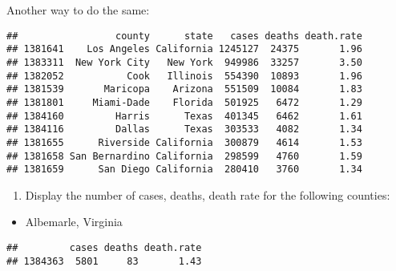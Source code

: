 \documentclass[
]{article}
\newenvironment{Shaded}{\begin{snugshade}}{\end{snugshade}}
\newcommand{\DecValTok}[1]{\textcolor[rgb]{0.00,0.00,0.81}{#1}}
\newcommand{\FunctionTok}[1]{\textcolor[rgb]{0.00,0.00,0.00}{#1}}
\newcommand{\NormalTok}[1]{#1}
\newcommand{\SpecialCharTok}[1]{\textcolor[rgb]{0.00,0.00,0.00}{#1}}
\newcommand{\StringTok}[1]{\textcolor[rgb]{0.31,0.60,0.02}{#1}}
\providecommand{\tightlist}{%
  \setlength{\itemsep}{0pt}\setlength{\parskip}{0pt}}
\begin{document}
Another way to do the same:

\begin{Shaded}
\end{Shaded}

\begin{verbatim}
##                 county      state   cases deaths death.rate
## 1381641    Los Angeles California 1245127  24375       1.96
## 1383311  New York City   New York  949986  33257       3.50
## 1382052           Cook   Illinois  554390  10893       1.96
## 1381539       Maricopa    Arizona  551509  10084       1.83
## 1381801     Miami-Dade    Florida  501925   6472       1.29
## 1384160         Harris      Texas  401345   6462       1.61
## 1384116         Dallas      Texas  303533   4082       1.34
## 1381655      Riverside California  300879   4614       1.53
## 1381658 San Bernardino California  298599   4760       1.59
## 1381659      San Diego California  280410   3760       1.34
\end{verbatim}

\begin{enumerate}
\def\labelenumi{\alph{enumi}.}
\setcounter{enumi}{6}
\tightlist
\item
  Display the number of cases, deaths, death rate for the following
  counties:
\end{enumerate}

\begin{itemize}
\tightlist
\item
  Albemarle, Virginia
\end{itemize}

\begin{Shaded}
\end{Shaded}

\begin{verbatim}
##         cases deaths death.rate
## 1384363  5801     83       1.43
\end{verbatim}
\end{document}

